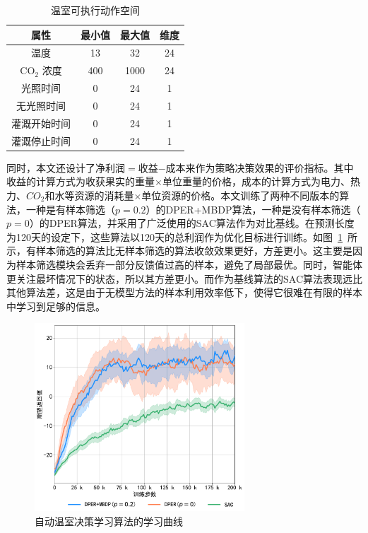 \begin{table}[htbp]
\centering
\caption{温室可执行动作空间}
\begin{tabular}{cccc}
\toprule
\textbf{属性}                                     & \textbf{最小值} & \textbf{最大值} & \textbf{维度} \\
\midrule
温度          & 13           & 32           & 24           \\
CO$_2$ 浓度               & 400          & 1000         & 24           \\
光照时间                 & 0            & 24           & 1            \\
无光照时间                & 0            & 24           & 1            \\
灌溉开始时间         & 0            & 24           & 1            \\
灌溉停止时间          & 0            & 24           & 1            \\
\bottomrule
\end{tabular}
\label{tab:act-space}
\end{table}

同时，本文还设计了净利润$=$收益$-$成本来作为策略决策效果的评价指标。其中收益的计算方式为收获果实的重量$\times$单位重量的价格，成本的计算方式为电力、热力、$CO_2$和水等资源的消耗量$\times$单位资源的价格。本文训练了两种不同版本的算法，一种是有样本筛选（$p=0.2$）的DPER+MBDP算法，一种是没有样本筛选（$p=0$）的DPER算法，并采用了广泛使用的SAC算法作为对比基线。在预测长度为120天的设定下，这些算法以120天的总利润作为优化目标进行训练。如图~\ref{fig:acml-train}~所示，有样本筛选的算法比无样本筛选的算法收敛效果更好，方差更小。这主要是因为样本筛选模块会丢弃一部分反馈值过高的样本，避免了局部最优。同时，智能体更关注最坏情况下的状态，所以其方差更小。而作为基线算法的SAC算法表现远比其他算法差，这是由于无模型方法的样本利用效率低下，使得它很难在有限的样本中学习到足够的信息。

\begin{figure}[h]
\centering
\includegraphics[width=0.7\textwidth]{figures/acml-train.pdf}
\caption{自动温室决策学习算法的学习曲线}
\label{fig:acml-train}
\end{figure}

